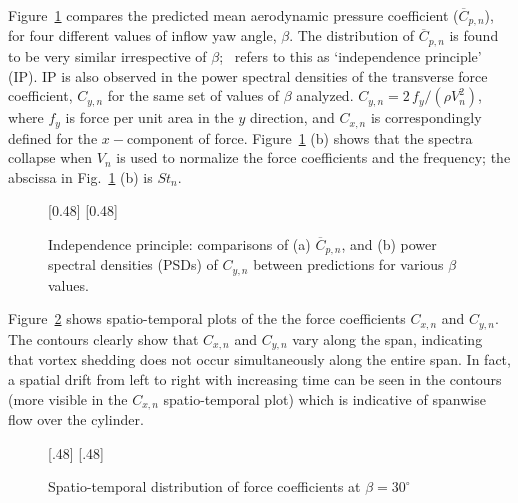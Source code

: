 Figure~\ref{fig:Compared_Yawed_Re20k} compares the predicted mean aerodynamic
pressure coefficient ($\overline{C}_{p,n}$), for four different values of
inflow yaw angle, $\beta$. The distribution of $\overline{C}_{p,n}$ is found to
be very similar irrespective of $\beta$;~\cite{zdravkovich2003flow} refers to
this as `independence principle' (IP). IP is also observed in the power
spectral densities of the transverse force coefficient, $C_{y,n}$ for the same
set of values of $\beta$ analyzed. $C_{y,n}=2\, f_y/ (\rho V^2_n)$, where $f_y$
is force per unit area in the $y$ direction, and $C_{x,n}$ is correspondingly
defined for the $x-$component of force.  Figure~\ref{fig:Compared_Yawed_Re20k}
(b) shows that the spectra collapse when $V_n$ is used to normalize the force
coefficients and the frequency; the abscissa in
Fig.~\ref{fig:Compared_Yawed_Re20k} (b) is $St_n$.  
%
\begin{figure}[htb!]
  [0.48\linewidth]
    {}
  \hspace*{\fill}
  [0.48\linewidth]
    {}
  \caption{Independence principle: comparisons of (a) $\overline{C}_{p,n}$, and
    (b) power spectral densities (PSDs) of $C_{y,n}$ between predictions for various $\beta$ values.}
\label{fig:Compared_Yawed_Re20k}
\end{figure}

Figure~\ref{fig:Spatial_temporal_CxCyRe20k} shows spatio-temporal plots of the
the force coefficients $C_{x,n}$ and $C_{y,n}$.  The contours clearly show that
$C_{x,n}$ and $C_{y,n}$ vary along the span, indicating that vortex shedding
does not occur simultaneously along the entire span. In fact, a spatial drift
from left to right with increasing time can be seen in the contours (more
visible in the $C_{x,n}$ spatio-temporal plot) which is indicative of spanwise
flow over the cylinder.
%
\begin{figure}[htb!]
    [.48\linewidth]{}
  \hspace*{\fill}
    [.48\linewidth]{}
  \caption{Spatio-temporal distribution of force coefficients at
  $\beta=30^\circ$}
  \label{fig:Spatial_temporal_CxCyRe20k}
\end{figure}

